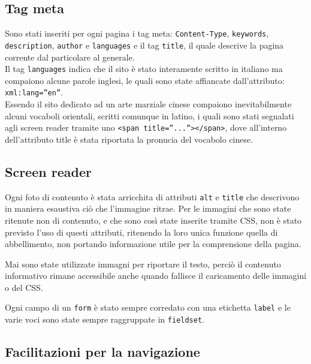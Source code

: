 \FloatBarrier


\subsection{Tag meta}
Sono stati inseriti per ogni pagina i tag meta: \texttt{Content-Type}, \texttt{keywords}, \texttt{description}, \texttt{author} e \texttt{languages} e il tag \texttt{title}, il quale descrive la pagina corrente dal particolare al generale. \\
Il tag \texttt{languages} indica che il sito è stato interamente scritto in italiano ma compaiono alcune parole inglesi, le quali sono state affiancate dall'attributo: \texttt{xml:lang=''en''}.\\
Essendo il sito dedicato ad un arte marziale cinese compaiono inevitabilmente alcuni vocaboli orientali, scritti comunque in latino, i quali sono stati segnalati agli screen reader tramite uno \texttt{<span title=''...''></span>}, dove all'interno dell'attributo title è stata riportata la pronucia del vocabolo cinese. 


\subsection{Screen reader}

Ogni foto di contenuto è stata arricchita di attributi \texttt{alt} e \texttt{title} che descrivono in maniera esaustiva ciò che l'immagine ritrae. Per le immagini che sono state ritenute non di contenuto, e che sono così state inserite tramite CSS, non è stato previsto l'uso di questi attributi, ritenendo la loro unica funzione quella di abbellimento, non portando informazione utile per la comprensione della pagina.

Mai sono state utilizzate immagni per riportare il testo, perciò il contenuto informativo rimane accessibile anche quando fallisce il caricamento delle immagini o del CSS.

Ogni campo di un \texttt{form} è stato sempre corredato con una etichetta \texttt{label} e le varie voci sono state sempre raggruppate in \texttt{fieldset}.

\subsection{Facilitazioni per la navigazione}

